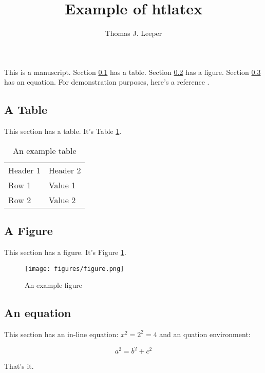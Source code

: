 \documentclass{article}
\title{Example of htlatex}
\author{Thomas J. Leeper}
\begin{document}
\maketitle

This is a manuscript. Section \ref{sec:table} has a table. Section \ref{sec:figure} has a figure. Section \ref{sec:eq} has an equation. For demonstration purposes, here's a reference \citep{Grovesetal2006}.

\subsection{A Table}\label{sec:table}

This section has a table. It's Table \ref{tab:table1}.

\begin{table}
\caption{An example table}\label{tab:table1}
\begin{tabular}{ll}
Header 1 & Header 2\\
Row 1 & Value 1 \\
Row 2 & Value 2 \\
\end{tabular}
\end{table}

\subsection{A Figure}\label{sec:figure}

This section has a figure. It's Figure \ref{fig:fig1}.

\begin{figure}
\caption{An example figure}\label{fig:fig1}
\texttt{[image: figures/figure.png]}
\end{figure}

\subsection{An equation}\label{sec:eq}

This section has an in-line equation: $x^2 = 2^2 = 4$ and an quation environment:

\begin{equation}
a^2 = b^2 + c^2
\end{equation}

That's it.



\end{document}
